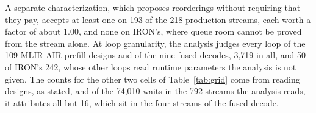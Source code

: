 A separate characterization, which proposes reorderings without requiring that they pay, accepts at least one on 193 of the 218 production streams, each worth a factor of about 1.00, and none on IRON's, where queue room cannot be proved from the stream alone.
At loop granularity, the analysis judges every loop of the 109 MLIR-AIR prefill designs and of the nine fused decodes, 3{,}719 in all, and 50 of IRON's 242, whose other loops read runtime parameters the analysis is not given.
The counts for the other two cells of Table~\ref{tab:grid} come from reading designs, as stated, and of the 74{,}010 waits in the 792 streams the analysis reads, it attributes all but 16, which sit in the four streams of the fused decode.
